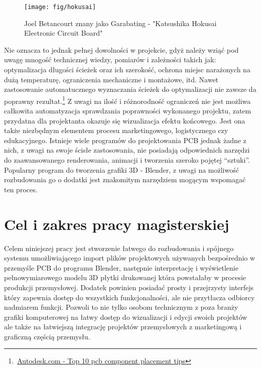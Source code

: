 \documentclass[brudnopis]{xmgr}
\begin{document}
\begin{figure}[!tbh]
\centering
\texttt{[image: fig/hokusai]}
\caption{Joel Betancourt znany jako Garabating - "Katsushika Hokusai Electronic Circuit Board"\label{RYS.1}}
\end{figure}

Nie oznacza to jednak pełnej dowolności w projekcie, gdyż należy wziąć pod uwagę mnogość technicznej wiedzy, pomiarów i zależności takich jak: optymalizacja długości ścieżek oraz ich szerokość, ochrona miejsc narażonych na dużą temperaturę, ograniczenia mechaniczne i montażowe, itd. Nawet zastosowanie automatucznego wyznaczania ścieżek do optymalizacji nie zawsze da poprawny rezultat.\footnote{\,\href{https://www.autodesk.com/products/eagle/blog/top-10-pcb-component-placement-tips-pcb-beginner/}{Autodesk.com - Top 10 pcb component placement tips}} Z uwagi na ilość i różnorodność ograniczeń nie jest możliwa całkowita automatyzacja sprawdzania poprawności wykonanego projektu, zatem przydatna dla projektanta okazuje się wizualizacja efektu końcowego. Jest ona także niezbędnym elementem procesu marketingowego, logistycznego czy edukacyjnego. Istnieje wiele programów do projektowania PCB jednak żadne z nich, z uwagi na swoje ścisłe zastosowania, nie posiadają odpowiednich narzędzi do zaawansowanego renderowania, animacji i tworzenia szeroko pojętej “sztuki”. Popularny program do tworzenia grafiki 3D - Blender, z uwagi na możliwość rozbudowania go o dodatki jest znakomitym narzędziem mogącym wspomagać ten proces.



\chapter{Cel i zakres pracy magisterskiej}

Celem niniejszej pracy jest stworzenie łatwego do rozbudowania i spójnego systemu umożliwiającego import plików projektowych używanych bezpośrednio w przemyśle PCB do programu Blender, następnie interpretację i wyświetlenie pełnowymiarowego modelu 3D płytki drukowanej która powstałaby w procesie produkcji przemysłowej. Dodatek powinien posiadać prosty i przejrzysty interfejs który zapewnia dostęp do wszystkich funkcjonalności, ale nie przytłacza odbiorcy nadmiarem funkcji. Pozwoli to nie tylko osobom technicznym z poza branży grafiki komputerowej na łatwy dostęp do wizualizacji i edycji swoich projektów ale także na łatwiejszą integrację projektów przemysłowych z marketingową i graficzną częścią przemysłu.
\end{document}
